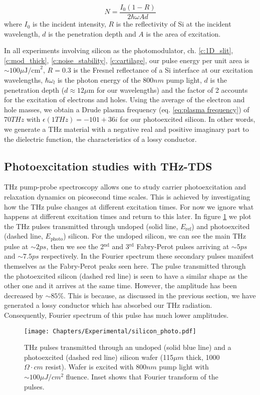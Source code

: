 \begin{equation}
N=\frac{I_0(1-R)}{2\hbar\omega A d}
\label{eq:Si carrier density}
\end{equation}
where $I_0$ is the incident intensity, $R$ is the reflectivity of Si at the incident wavelength, $d$ is the penetration depth and $A$ is the area of excitation. 


In all experiments involving silicon as the photomodulator, ch. \ref{c:1D_slit}, \ref{c:mod_thick}, \ref{c:noise_stability}, \ref{c:cartilage}, our pulse energy per unit area is $\sim 100\mu\text{J/cm}^2$, $R=0.3$ is the Fresnel reflectance of a Si interface at our excitation wavelengths, $\hbar \omega_l$ is the photon energy of the 800$nm$ pump light, $d$ is the penetration depth ($d$$\approx$$12\mu\text{m}$  \cite{si_depth} for our wavelengths) and the factor of 2 accounts for the excitation of electrons and holes. Using the average of the electron and hole masses, we obtain a Drude plasma frequency (eq. \ref{eq:plasma frequency}) of 70$THz$ with $\epsilon(1THz)=-101+36i$ for our photoexcited silicon. In other words, we generate a THz material with a negative real and positive imaginary part to the dielectric function, the characteristics of a lossy conductor.



\subsection{Photoexcitation studies with THz-TDS}\label{sec:photo_studies}
THz pump-probe spectroscopy allows one to study carrier photoexcitation and relaxation dynamics on picosecond time scales. This is achieved by investigating how the THz pulse changes at different excitation times. For now  we ignore what happens at different excitation times and return to this later. In figure \ref{fig:silicon_photo} we plot the THz pulses transmitted through undoped (solid line, $E_{\mbox{ref}}$) and photoexcited (dashed line, $E_{\mbox{photo}}$) silicon. For the undoped silicon, we can see the main THz pulse at $\sim 2ps$, then we see the 2$^{\mbox{nd}}$ and 3$^{\mbox{rd}}$ Fabry-Perot pulses arriving at $\sim 5ps$ and $\sim 7.5ps$ respectively. In the Fourier spectrum these secondary pulses manifest themselves as the Fabry-Perot peaks seen here. The pulse transmitted through the photoexcited silicon (dashed red line) is seen to have a similar shape as the other one and it arrives at the same time. However, the amplitude has been decreased by $\sim 85 \%$. This is because, as discussed in the previous section, we have generated a lossy conductor which has absorbed our THz radiation. Consequently, Fourier spectrum of this pulse has much lower amplitudes. 
\begin{figure}[h!]\centering
\texttt{[image: Chapters/Experimental/silicon\_photo.pdf]}
\caption{THz pulses transmitted through an undoped (solid blue line) and a photoexcited (dashed red line) silicon wafer (115$\mu m$ thick, 1000$\Omega \cdot cm$ resist). Wafer is excited with 800$nm$ pump light with $\sim 100\mu J/cm^2$ fluence. Inset shows that Fourier transform of the pulses.}
\label{fig:silicon_photo}
\end{figure}

